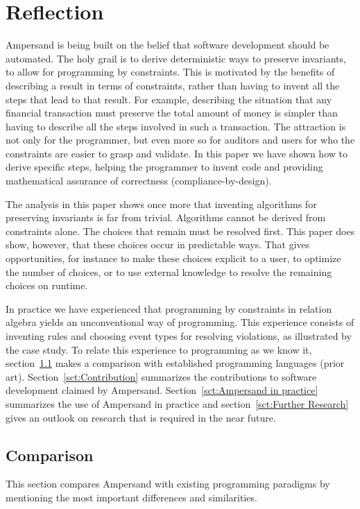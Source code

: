 \documentclass{elsarticle}
\begin{document}
\section{Reflection}
\label{sct:Reflection}
	Ampersand is being built on the belief that software development should be automated.
	The holy grail is to derive deterministic ways to preserve invariants, to allow for programming by constraints.
	This is motivated by the benefits of describing a result in terms of constraints,
	rather than having to invent all the steps that lead to that result.
	For example, describing the situation that any financial transaction must preserve the total amount of money is simpler
	than having to describe all the steps involved in such a transaction.
	The attraction is not only for the programmer, but even more so for auditors and users for who the constraints are easier to grasp and validate.
	In this paper we have shown how to derive specific steps,
	helping the programmer to invent code and providing mathematical assurance of correctness (compliance-by-design).

	The analysis in this paper shows once more that inventing algorithms for preserving invariants is far from trivial.
	Algorithms cannot be derived from constraints alone. The choices that remain must be resolved first.
	This paper does show, however, that these choices occur in predictable ways.
	That gives opportunities, for instance to make these choices explicit to a user, to optimize the number of choices,
	or to use external knowledge to resolve the remaining choices on runtime.

	In practice we have experienced that programming by constraints in relation algebra yields an unconventional way of programming.
	This experience consists of inventing rules and choosing event types for resolving violations, as illustrated by the case study.
	To relate this experience to programming as we know it, section~\ref{sct:Comparison} makes a comparison with established programming languages (prior art).
	Section~\ref{sct:Contribution} summarizes the contributions to software development claimed by Ampersand.
	Section~\ref{sct:Ampersand in practice} summarizes the use of Ampersand in practice and
	section~\ref{sct:Further Research} gives an outlook on research that is required in the near future.

\subsection{Comparison}
\label{sct:Comparison}
	This section compares Ampersand with existing programming paradigms by mentioning the most important differences and similarities.
\end{document}

